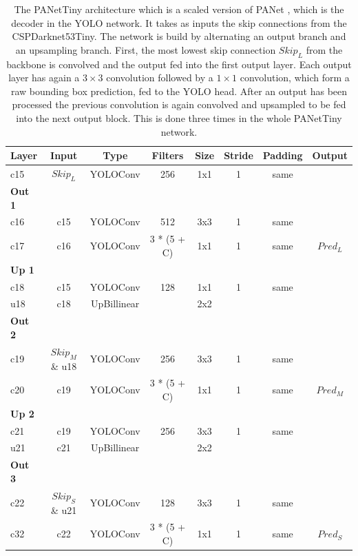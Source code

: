 \begin{table}
\begin{center}

\begin{tabular}{l|c|c|c|c|c|c|c}
    \textbf{Layer} & \textbf{Input} & \textbf{Type} & \textbf{Filters} & \textbf{Size} & \textbf{Stride} & \textbf{Padding} & \textbf{Output} \\
    \hline
    c15 & $Skip_L$ & YOLOConv & 256 & 1x1 & 1 & same\\
    \textbf{Out 1} & & & & & &\\
    c16 & c15 & YOLOConv & 512 & 3x3 & 1 & same\\
    c17 & c16 & YOLOConv & 3 * (5 + C) & 1x1 & 1 & same & $Pred_L$\\
    \textbf{Up 1}& & & & & &\\
    c18 & c15 & YOLOConv & 128 & 1x1 & 1 & same \\
    u18 & c18 & UpBillinear & & 2x2 & &\\
    \textbf{Out 2}& & & & & &\\
    c19 & $Skip_M$ \& u18 & YOLOConv & 256 & 3x3 & 1 & same\\
    c20 & c19 & YOLOConv & 3 * (5 + C) & 1x1 & 1 & same & $Pred_M$\\
    \textbf{Up 2}& & & & & &\\
    c21 & c19 & YOLOConv & 256 & 3x3 & 1 & same\\
    u21 & c21 & UpBillinear & & 2x2 & &\\
    \textbf{Out 3}& & & & & &\\
    c22 & $Skip_S$ \& u21 & YOLOConv & 128 & 3x3 & 1 & same\\
    c32 & c22 & YOLOConv & 3 * (5 + C) & 1x1 & 1 & same & $Pred_S$\\
\end{tabular}

\caption{The PANetTiny architecture which is a scaled version of PANet \cite{pannet}, which is the decoder in the YOLO network. It takes as inputs the skip connections from the CSPDarknet53Tiny. The network is build by alternating an output branch and an upsampling branch. First, the most lowest skip connection $Skip_L$ from the backbone is convolved and the output fed into the first output layer. Each output layer has again a $3\times3$ convolution followed by a $1\times1$ convolution, which form a raw bounding box prediction, fed to the YOLO head. After an output has been processed the previous convolution is again convolved and upsampled to be fed into the next output block. This is done three times in the whole PANetTiny network.}
\label{tab:panet_tiny_arch}
\end{center}
\end{table}


